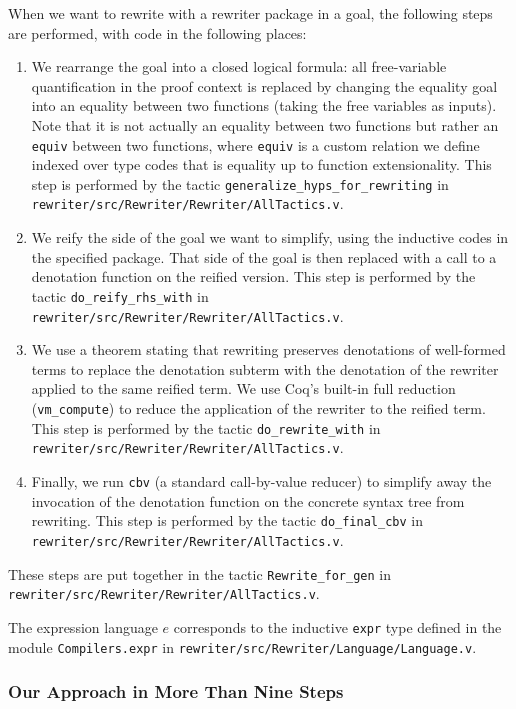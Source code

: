 \documentclass[a4paper,USenglish,cleveref,autoref,thm-restate]{lipics-v2021}
\newcommand{\tacvmcompute}{\texttt{vm_compute}}
\newcommand{\taccbv}{\texttt{cbv}}
\begin{document}
\begin{minipage}[t][1cm]{\textwidth}
When we want to rewrite with a rewriter package in a goal, the following steps are performed, with code in the following places:
\begin{enumerate}
  \item
    We rearrange the goal into a closed logical formula: all free-variable quantification in the proof context is replaced by changing the equality goal into an equality between two functions (taking the free variables as inputs).
    Note that it is not actually an equality between two functions but rather an \texttt{equiv} between two functions, where \texttt{equiv} is a custom relation we define indexed over type codes that is equality up to function extensionality.
    This step is performed by the tactic \texttt{generalize\_hyps\_for\_rewriting} in \texttt{rewriter/src/Rewriter/Rewriter/AllTactics.v}.
  \item
    We reify the side of the goal we want to simplify, using the inductive codes in the specified package.
    That side of the goal is then replaced with a call to a denotation function on the reified version.
    This step is performed by the tactic \texttt{do\_reify\_rhs\_with} in \texttt{rewriter/src/Rewriter/Rewriter/AllTactics.v}.
  \item
    We use a theorem stating that rewriting preserves denotations of well-formed terms to replace the denotation subterm with the denotation of the rewriter applied to the same reified term.
    We use Coq's built-in full reduction (\tacvmcompute{}) to reduce the application of the rewriter to the reified term.
    This step is performed by the tactic \texttt{do\_rewrite\_with} in \texttt{rewriter/src/Rewriter/Rewriter/AllTactics.v}.
  \item
    Finally, we run \taccbv{} (a standard call-by-value reducer) to simplify away the invocation of the denotation function on the concrete syntax tree from rewriting.
    This step is performed by the tactic \texttt{do\_final\_cbv} in \texttt{rewriter/src/Rewriter/Rewriter/AllTactics.v}.
\end{enumerate}
These steps are put together in the tactic \texttt{Rewrite\_for\_gen} in \texttt{rewriter/src/Rewriter/Rewriter/AllTactics.v}.

The expression language $e$ corresponds to the inductive \texttt{expr} type defined in the module \texttt{Compilers.expr} in \texttt{rewriter/src/Rewriter/Language/Language.v}.

\subsubsection*{Our Approach in More Than Nine Steps}


\end{minipage}
\end{document}
